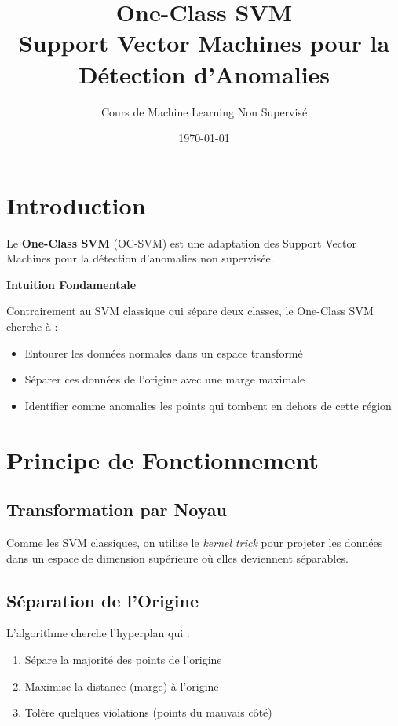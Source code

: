 \documentclass[a4paper,11pt]{article}
\title{\textbf{One-Class SVM} \\ \large Support Vector Machines pour la Détection d'Anomalies}
\author{Cours de Machine Learning Non Supervisé}
\date{\today}
\begin{document}
\maketitle
\tableofcontents
\newpage

\section{Introduction}

Le \textbf{One-Class SVM} (OC-SVM) est une adaptation des Support Vector Machines pour la détection d'anomalies non supervisée.

\begin{conceptbox}
\textbf{Intuition Fondamentale}

Contrairement au SVM classique qui sépare deux classes, le One-Class SVM cherche à :
\begin{itemize}
    \item Entourer les données normales dans un espace transformé
    \item Séparer ces données de l'origine avec une marge maximale
    \item Identifier comme anomalies les points qui tombent en dehors de cette région
\end{itemize}
\end{conceptbox}

\section{Principe de Fonctionnement}

\subsection{Transformation par Noyau}

Comme les SVM classiques, on utilise le \textit{kernel trick} pour projeter les données dans un espace de dimension supérieure où elles deviennent séparables.

\subsection{Séparation de l'Origine}

L'algorithme cherche l'hyperplan qui :
\begin{enumerate}
    \item Sépare la majorité des points de l'origine
    \item Maximise la distance (marge) à l'origine
    \item Tolère quelques violations (points du mauvais côté)
\end{enumerate}
\end{document}
